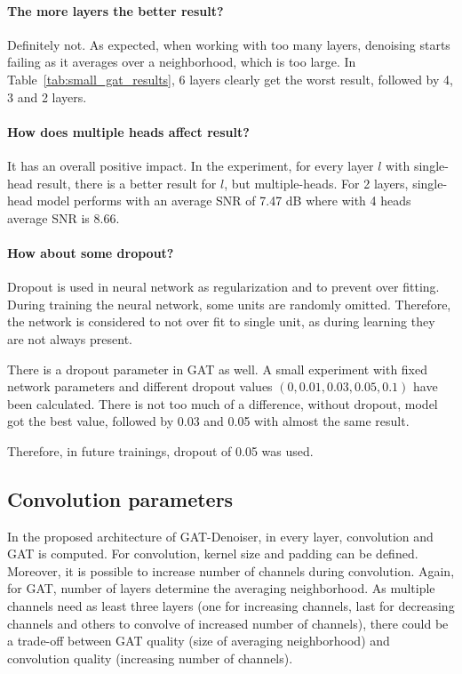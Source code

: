 \paragraph{The more layers the better result?}
Definitely not. As expected, when working with too many layers, denoising starts failing as it averages over a
neighborhood, which is too large. In Table~\ref{tab:small_gat_results}, 6 layers clearly get the worst result,
followed by 4, 3 and 2 layers.

\paragraph{How does multiple heads affect result?}
It has an overall positive impact. 
In the experiment, for every layer $l$ with single-head result, there
is a better result for $l$, but multiple-heads. 
For 2 layers, single-head model performs with an average SNR of 7.47 dB where with 4 heads average SNR is 8.66.

\paragraph{How about some dropout?}

Dropout is used in neural network as regularization and to prevent over fitting. 
During training the neural network, some units are randomly omitted. Therefore, the network is 
considered to not over fit to single unit, as during learning they are not always present.

There is a dropout parameter in GAT as well. A small experiment with fixed network parameters
and different dropout values $(0, 0.01, 0.03, 0.05, 0.1)$ have been calculated. 
There is not too much of a difference, without dropout, model got the best value, followed by 
0.03 and 0.05 with almost the same result. 

Therefore, in future trainings, dropout of 0.05 was used.


\subsection{Convolution parameters}

In the proposed architecture of GAT-Denoiser, in every layer, convolution and GAT is computed. For convolution, kernel size and padding can be defined.
Moreover, it is possible to increase number of channels during convolution. 
Again, for GAT, number of layers determine the averaging neighborhood.
As multiple channels need as least three layers (one for increasing channels, last for decreasing channels and others to convolve of increased number of channels),
there could be a trade-off between GAT quality (size of averaging neighborhood) and convolution quality (increasing number of channels). 

